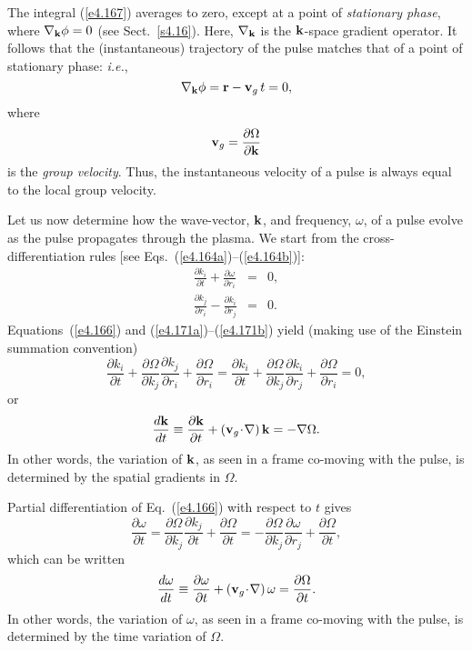 The integral (\ref{e4.167}) averages to zero, except at a point of {\em stationary
phase}, where $\nabla_{\bf k} \phi=0$ (see Sect.~\ref{s4.16}). Here, $\nabla_{\bf k}$ 
is the  ${\bf k}$-space
gradient operator. It follows that the (instantaneous) trajectory of the pulse
matches that of a point of stationary phase: {\em i.e.},
\begin{equation}
\nabla_{\bf k}\phi = {\bf r} - {\bf v}_g\,t=0,
\end{equation}
where
\begin{equation}
{\bf v}_g = \frac{\partial{\Omega}}{\partial {\bf k}}
\end{equation}
is the {\em group velocity}. Thus, the instantaneous velocity of a pulse is
always
equal to the local group velocity.

Let us now determine how the wave-vector, ${\bf k}$, and frequency, $\omega$,
of a pulse evolve as the pulse propagates through the
plasma. We start from the cross-differentiation rules
[see Eqs.~(\ref{e4.164a})--(\ref{e4.164b})]: 
\begin{eqnarray}\label{e4.171a}
\frac{\partial k_i}{\partial t} + \frac{\partial\omega}{\partial r_i} &=& 0,\\[0.5ex]
\frac{\partial k_j}{\partial r_i} - \frac{\partial k_i}{\partial r_j} &=& 0.\label{e4.171b}
\end{eqnarray}
Equations~(\ref{e4.166}) and (\ref{e4.171a})--(\ref{e4.171b}) yield (making use of the Einstein summation
convention)
\begin{equation}
\frac{\partial k_i}{\partial t} + \frac{\partial{\Omega}}{\partial k_j}
\frac{\partial k_j}{\partial r_i} +\frac{\partial{\Omega}}{\partial r_i}
= \frac{\partial k_i}{\partial t} + \frac{\partial{\Omega}}{\partial k_j}
\frac{\partial k_i}{\partial r_j} +\frac{\partial{\Omega}}{\partial r_i}=0,
\end{equation}
or
\begin{equation}
\frac{d{\bf k}}{dt}\equiv\frac{\partial {\bf k}}{\partial t} + ({\bf v}_g\!\cdot\!\nabla)\,
{\bf k} = -\nabla{\Omega}.
\end{equation}
In other words, the variation of ${\bf k}$, as seen in a frame co-moving with
the pulse, is determined by the spatial gradients in ${\Omega}$. 

Partial differentiation of Eq.~(\ref{e4.166}) with respect to $t$ gives
\begin{equation}
\frac{\partial\omega}{\partial t} = \frac{\partial{\Omega}}{\partial k_j}
\frac{\partial k_j}{\partial t} + \frac{\partial{\Omega}}{\partial t}
= -\frac{\partial {\Omega}}{\partial k_j}\frac{\partial\omega}{\partial r_j}
 + \frac{\partial{\Omega}}{\partial t},
\end{equation}
which can be written
\begin{equation}
\frac{d\omega}{dt} \equiv
\frac{\partial\omega}{\partial t} + ({\bf v}_g\!\cdot\!\nabla)\, \omega = 
\frac{\partial {\Omega}}{\partial t}.
\end{equation}
In other words, the variation of $\omega$, as seen in a frame co-moving with
the pulse, is determined by the time variation of ${\Omega}$. 

